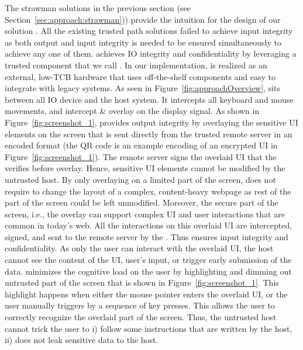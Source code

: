  The strawman solutions in the previous section (see Section~\ref{sec:approach:strawman})) provide the intuition for the design of our solution \name. All the existing trusted path solutions failed to achieve input integrity as both output and input integrity is needed to be ensured simultaneously to achieve any one of them. \name achieves IO integrity and confidentiality by leveraging a trusted component that we call \device. In our implementation, \device is realized as an external, low-TCB hardware that uses off-the-shelf components and easy to integrate with legacy systems. As seen in Figure~\ref{fig:approachOverview}, \device sits between all IO device and the host system. It intercepts all keyboard and mouse movements, and intercept \& overlay on the display signal. As shown in Figure~\ref{fig:screenshot_1}, \name provides output integrity by overlaying the sensitive UI elements on the screen that is sent directly from the trusted remote server in an encoded format (the QR code is an example encoding of an encrypted UI in Figure~\ref{fig:screenshot_1}). The remote server signs the overlaid UI that the \device verifies before overlay. Hence, sensitive UI elements cannot be modified by the untrusted host. By only overlaying on a limited part of the screen, \name does not require to change the layout of a complex, content-heavy webpage as rest of the part of the screen could be left unmodified.
Moreover, the secure part of the screen, i.e., the overlay can support complex UI and user interactions that are common in today's web. All the interactions on this overlaid UI are intercepted, signed, and sent to the remote server by the \device. Thus \name ensures input integrity and confidentiality. As only the user can interact with the overlaid UI, the host cannot see the content of the UI, user's input, or trigger early submission of the data.
\name minimizes the cognitive load on the user by highlighting and dimming out untrusted part of the screen that is shown in Figure~\ref{fig:screenshot_1}. This highlight happens when either the mouse pointer enters the overlaid UI, or the user manually triggers by a sequence of key presses. This allows the user to correctly recognize the overlaid part of the screen. Thus, the untrusted host cannot trick the user to i) follow some instructions that are written by the host, ii) does not leak sensitive data to the host. 
